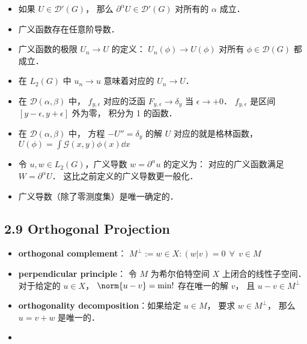 \begin{itemize}
\item 如果 $U \in\mathcal D'(G)$， 那么 $\partial^\alpha U \in\mathcal D'(G)$ 对所有的 $\alpha$ 成立．

\item 广义函数存在任意阶导数．

\item 广义函数的极限 $U_n \to U$ 的定义： $U_n(\phi)\to U(\phi)$ 对所有 $\phi \in\mathcal D(G)$ 都成立．

\item 在 $L_2(G)$ 中 $u_n\to u$ 意味着对应的 $U_n \to U$．

\item 在 $\mathcal D(\alpha,\beta)$ 中， $f_{y,\epsilon}$ 对应的泛函 $F_{y, \epsilon}\to \delta_y$ 当 $\epsilon \to +0$． $f_{y,\epsilon}$ 是区间 $[y-\epsilon,y+\epsilon]$ 外为零， 积分为 1 的函数．

\item 在 $\mathcal D(\alpha,\beta)$ 中， 方程 $-U'' = \delta_y$ 的解 $U$ 对应的就是格林函数， $U(\phi) = \int \mathcal G(x, y) \phi(x) \dd{x}$

\item 令 $u, w \in L_2(G)$，广义导数 $w = \partial^\alpha u$ 的定义为： 对应的广义函数满足 $W = \partial^\alpha U$． 这比之前定义的广义导数更一般化．

\item 广义导数（除了零测度集）是唯一确定的．
\end{itemize}

\subsection{2.9 Orthogonal Projection}
\begin{itemize}
\item \textbf{orthogonal complement}： $M^\bot := {w \in X: (w|v) = 0\ \ \forall\ \ v\in M}$

\item \textbf{perpendicular principle}： 令 $M$ 为希尔伯特空间 $X$ 上闭合的线性子空间． 对于给定的 $u\in X$， $\norm{u - v} = \min!$ 存在唯一的解 $v$， 且 $u - v\in M^\bot$

\item \textbf{orthogonality decomposition}：如果给定 $u \in M$， 要求 $w \in M^\bot$， 那么 $u = v + w$ 是唯一的．

\item 
\end{itemize}

